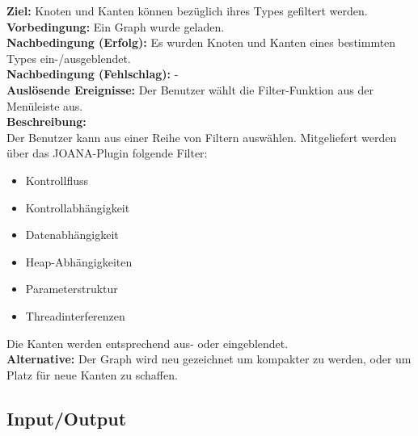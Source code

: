 \label{fa:filter}
\textbf{Ziel:} Knoten und Kanten können bezüglich ihres Types gefiltert werden.\\
\textbf{Vorbedingung:} Ein Graph wurde geladen.\\
\textbf{Nachbedingung (Erfolg):} Es wurden Knoten und Kanten eines bestimmten Types ein-/ausgeblendet.\\
\textbf{Nachbedingung (Fehlschlag):} -\\
\textbf{Auslösende Ereignisse:}
Der Benutzer wählt die Filter-Funktion aus der Menüleiste aus.\\
\textbf{Beschreibung:}\\
Der Benutzer kann aus einer Reihe von Filtern auswählen.
Mitgeliefert werden über das JOANA-Plugin folgende Filter: %
\begin{itemize}[nolistsep]
  \item Kontrollfluss
  \item Kontrollabhängigkeit
  \item Datenabhängigkeit
  \item Heap-Abhängigkeiten
  \item Parameterstruktur
  \item Threadinterferenzen
\end{itemize}
Die Kanten werden entsprechend aus- oder eingeblendet.\\
\textbf{Alternative:}
Der Graph wird neu gezeichnet um kompakter zu werden, oder um Platz für neue Kanten zu schaffen.

\subsection{Input/Output}
\setcounter{fanr}{100}

